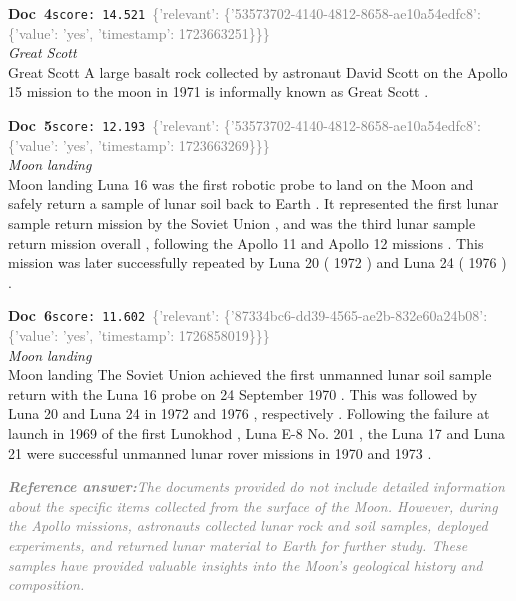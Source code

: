 \documentclass[a4paper,11pt]{article}
\begin{document}
\begin{docenv}
{\footnotesize\textcolor{doccolor}{\textbf{Doc~4}}}\hfill{\tiny\texttt{score:~14.521}}\ {\tiny\textcolor{gray}{\{'relevant': \{'53573702-4140-4812-8658-ae10a54edfc8': \{'value': 'yes', 'timestamp': 1723663251\}\}\}}}\\[3pt]
{\small\textit{Great Scott}}\\[2pt]
\vspace{2pt}
{\footnotesize Great Scott
A large basalt rock collected by astronaut David Scott on the Apollo 15 mission to the moon in 1971 is informally known as Great Scott .}
\end{docenv}
\begin{docenv}
{\footnotesize\textcolor{doccolor}{\textbf{Doc~5}}}\hfill{\tiny\texttt{score:~12.193}}\ {\tiny\textcolor{gray}{\{'relevant': \{'53573702-4140-4812-8658-ae10a54edfc8': \{'value': 'yes', 'timestamp': 1723663269\}\}\}}}\\[3pt]
{\small\textit{Moon landing}}\\[2pt]
\vspace{2pt}
{\footnotesize Moon landing
Luna 16 was the first robotic probe to land on the Moon and safely return a sample of lunar soil back to Earth . It represented the first lunar sample return mission by the Soviet Union , and was the third lunar sample return mission overall , following the Apollo 11 and Apollo 12 missions . This mission was later successfully repeated by Luna 20 ( 1972 ) and Luna 24 ( 1976 ) .}
\end{docenv}
\begin{docenv}
{\footnotesize\textcolor{doccolor}{\textbf{Doc~6}}}\hfill{\tiny\texttt{score:~11.602}}\ {\tiny\textcolor{gray}{\{'relevant': \{'87334bc6-dd39-4565-ae2b-832e60a24b08': \{'value': 'yes', 'timestamp': 1726858019\}\}\}}}\\[3pt]
{\small\textit{Moon landing}}\\[2pt]
\vspace{2pt}
{\footnotesize Moon landing
The Soviet Union achieved the first unmanned lunar soil sample return with the Luna 16 probe on 24 September 1970 . This was followed by Luna 20 and Luna 24 in 1972 and 1976 , respectively . Following the failure at launch in 1969 of the first Lunokhod , Luna E-8 No. 201 , the Luna 17 and Luna 21 were successful unmanned lunar rover missions in 1970 and 1973 .}
\end{docenv}
\begin{refanswerenv}
{\footnotesize\textit{\textcolor{gray}{\textbf{Reference answer:}\enspace The documents provided do not include detailed information about the specific items collected from the surface of the Moon. However, during the Apollo missions, astronauts collected lunar rock and soil samples, deployed experiments, and returned lunar material to Earth for further study. These samples have provided valuable insights into the Moon's geological history and composition.}}}
\end{refanswerenv}
\end{document}
